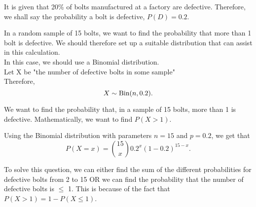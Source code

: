 %
%
%

\begin{subquestions}
	
	
\subquestion

It is given that 20\% of bolts manufactured at a factory are defective. Therefore, we shall say the probability a bolt is defective, $P(D)= 0.2$. 

\begin{subsubquestions}
	
	
\subsubquestion	
In a random sample of 15 bolts, we want to find the probability that more than 1 bolt is defective. We should therefore set up a suitable distribution that can assist in this calculation. \\
In this case, we should use a Binomial distribution.\\

Let X be "the number of defective bolts in some sample" \\
Therefore, 
\begin{equation}
 X \sim \text{Bin}(n,0.2). 	\\ \nonumber
	\end{equation}


We want to find the probability that, in a sample of 15 bolts, more than 1 is defective. Mathematically, we want to find $P(X>1)$.

Using the Binomial distribution with parameters $n=15$ and $p=0.2$, we get that
\begin{equation}
		P(X = x) = { 15 \choose x} 0.2^x (1-0.2)^{15-x}. 
\end{equation}

To solve this question, we can either find the sum of the different probabilities for defective bolts from 2 to 15 OR we can find the probability that the number of defective bolts is $\leq$ 1. This is because of the fact that $P(X>1)=1-P(X\leq1)$.  \\


\end{subsubquestions}
\end{subquestions}
